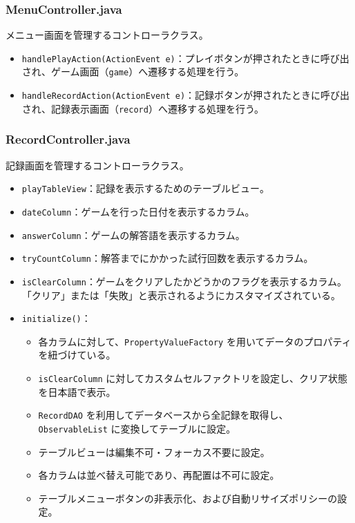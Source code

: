 \documentclass[a4j]{ujarticle}
\begin{document}
\subsubsection{MenuController.java}
メニュー画面を管理するコントローラクラス。
\begin{itemize}
\item \texttt{handlePlayAction(ActionEvent e)}：プレイボタンが押されたときに呼び出され、ゲーム画面（\texttt{game}）へ遷移する処理を行う。
\item \texttt{handleRecordAction(ActionEvent e)}：記録ボタンが押されたときに呼び出され、記録表示画面（\texttt{record}）へ遷移する処理を行う。
\end{itemize}


\subsubsection{RecordController.java}
記録画面を管理するコントローラクラス。

\begin{itemize}
  \item \texttt{playTableView}：記録を表示するためのテーブルビュー。
  \item \texttt{dateColumn}：ゲームを行った日付を表示するカラム。
  \item \texttt{answerColumn}：ゲームの解答語を表示するカラム。
  \item \texttt{tryCountColumn}：解答までにかかった試行回数を表示するカラム。
  \item \texttt{isClearColumn}：ゲームをクリアしたかどうかのフラグを表示するカラム。「クリア」または「失敗」と表示されるようにカスタマイズされている。
  \item \texttt{initialize()}：
  \begin{itemize}
    \item 各カラムに対して、\texttt{PropertyValueFactory} を用いてデータのプロパティを紐づけている。
    \item \texttt{isClearColumn} に対してカスタムセルファクトリを設定し、クリア状態を日本語で表示。
    \item \texttt{RecordDAO} を利用してデータベースから全記録を取得し、\texttt{ObservableList} に変換してテーブルに設定。
    \item テーブルビューは編集不可・フォーカス不要に設定。
    \item 各カラムは並べ替え可能であり、再配置は不可に設定。
    \item テーブルメニューボタンの非表示化、および自動リサイズポリシーの設定。
  \end{itemize}
\end{itemize}
\end{document}
